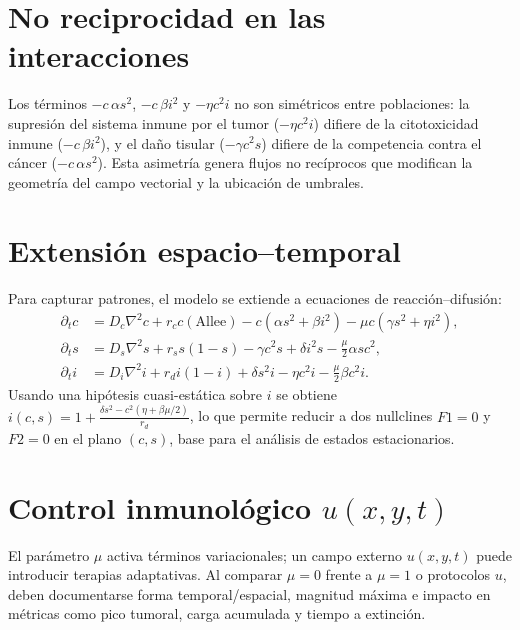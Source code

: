 \section{No reciprocidad en las interacciones}
Los términos $-c\,\alpha s^2$, $-c\,\beta i^2$ y $-\eta c^2 i$ no son simétricos entre poblaciones: la supresión del sistema inmune por el tumor ($-\eta c^2 i$) difiere de la citotoxicidad inmune ($-c\,\beta i^2$), y el daño tisular ($-\gamma c^2 s$) difiere de la competencia contra el cáncer ($-c\,\alpha s^2$). Esta asimetría genera flujos no recíprocos que modifican la geometría del campo vectorial y la ubicación de umbrales.

\section{Extensión espacio--temporal}
Para capturar patrones, el modelo se extiende a ecuaciones de reacción--difusión:
\begin{align}
\partial_t c &= D_c \nabla^2 c + r_c c(\text{Allee}) - c(\alpha s^2 + \beta i^2) - \mu c(\gamma s^2 + \eta i^2), \label{eqn:cancer_dynamic_spatial}\\
\partial_t s &= D_s \nabla^2 s + r_s s(1-s) - \gamma c^2 s + \delta i^2 s - \tfrac{\mu}{2}\alpha s c^2, \label{eqn:sano_dynamic_spatial}\\
\partial_t i &= D_i \nabla^2 i + r_d i(1-i) + \delta s^2 i - \eta c^2 i - \tfrac{\mu}{2}\beta c^2 i. \label{eqn:inmune_dynamic_spatial}
\end{align}
Usando una hipótesis cuasi-estática sobre $i$ se obtiene $i(c,s)= 1 + \frac{\delta s^2 - c^2(\eta + \beta \mu/2)}{r_d}$, lo que permite reducir a dos nullclines $F1=0$ y $F2=0$ en el plano $(c,s)$, base para el análisis de estados estacionarios.

\section{Control inmunológico $u(x,y,t)$}
El parámetro $\mu$ activa términos variacionales; un campo externo $u(x,y,t)$ puede introducir terapias adaptativas. Al comparar $\mu=0$ frente a $\mu=1$ o protocolos $u$, deben documentarse forma temporal/espacial, magnitud máxima e impacto en métricas como pico tumoral, carga acumulada y tiempo a extinción.

